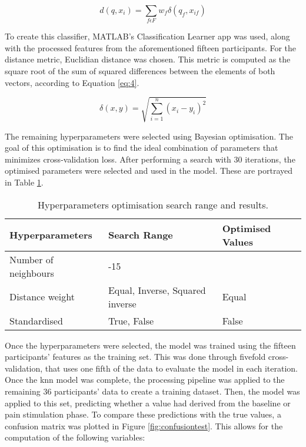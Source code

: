 \begin{equation} \label{eq:4}
d(q,x_i)=\sum_{f\epsilon F}^{}w_f\delta(q_f,x_{if})
\end{equation}



To create this classifier, MATLAB's Classification Learner app was used, along with the processed features from the aforementioned fifteen participants. For the distance metric, Euclidian distance was chosen. This metric is computed as the square root of the sum of squared differences between the elements of both vectors, according to Equation \ref{eq:4}.

\begin{equation} \label{eq:4}
\delta(x,y)=\sqrt{\sum_{i=1}^{n}(x_i-y_i)^2}
\end{equation}

The remaining hyperparameters were selected using Bayesian optimisation. The goal of this optimisation is to find the ideal combination of parameters that minimizes cross-validation loss. After performing a search with 30 iterations, the optimised parameters were selected and used in the model. These are portrayed in Table \ref{table:hyperparameters}. 

\begin{table}[h]
    \centering
    \captionsetup{justification=raggedright, singlelinecheck=false}
    \caption{Hyperparameters optimisation search range and results.}
    \renewcommand{\arraystretch}{1.2}

    \begingroup
    \sloppy
    \begin{tabular}{@{}>{\RaggedRight\arraybackslash}p{4.3cm} >{\RaggedRight\arraybackslash}p{5.7cm} >{\RaggedRight\arraybackslash}p{4cm}@{}}
        \hline
        \textbf{Hyperparameters} & \textbf{Search Range} & \textbf{Optimised Values} \\
        \midrule
        Number of neighbours & 1-15 & 2 \\
        [1ex]
        Distance weight & Equal, Inverse, Squared inverse & Equal \\
        [1ex]
        Standardised & True, False & False \\
    \end{tabular}
    \endgroup
    \label{table:hyperparameters}
\end{table}    



Once the hyperparameters were selected, the model was trained using the fifteen participants' features as the training set. This was done through fivefold cross-validation, that uses one fifth of the data to evaluate the model in each iteration. Once the \ac{knn} model was complete, the processing pipeline was applied to the remaining 36 participants' data to create a training dataset. Then, the model was applied to this set, predicting whether a value had derived from the baseline or pain stimulation phase. To compare these predictions with the true values, a confusion matrix was plotted in Figure \ref{fig:confusiontest}. This allows for the computation of the following variables:

